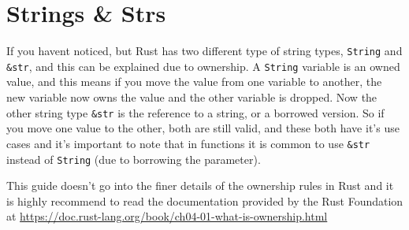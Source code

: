 \section{Strings \& Strs}
If you havent noticed, but Rust has two different type of string types, \verb!String! and \verb!&str!, and this 
can be explained due to ownership. A \verb!String! variable is an owned value, and this means if you move the value from
one variable to another, the new variable now owns the value and the other variable is dropped. Now the other string type 
 \verb!&str! is the reference to a string, or a borrowed version. So if you move one value to the other, both are still valid, 
and these both have it's use cases and it's important to note that in functions it is common to use \verb!&str! instead of \verb!String! (due to borrowing the parameter). 

This guide doesn't go into the finer details of the ownership rules in Rust and it is highly recommend to read the documentation provided by the Rust Foundation at \url{https://doc.rust-lang.org/book/ch04-01-what-is-ownership.html}
